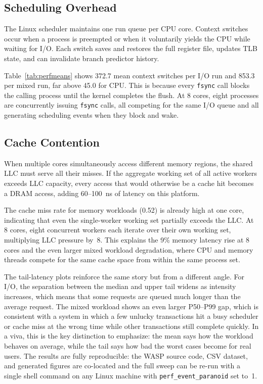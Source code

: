 \documentclass[conference]{IEEEtran}
\begin{document}
\subsection{Scheduling Overhead}

The Linux scheduler maintains one run queue per CPU core.  Context switches
occur when a process is preempted or when it voluntarily yields the CPU while
waiting for I/O.  Each switch saves and restores the full register file,
updates TLB state, and can invalidate branch predictor history.

Table~\ref{tab:perfmeans} shows 372.7 mean context switches per I/O run and
853.3 per mixed run, far above 45.0 for CPU.  This is because every
\texttt{fsync} call blocks the calling process until the kernel completes the
flush.  At 8 cores, eight processes are concurrently issuing \texttt{fsync}
calls, all competing for the same I/O queue and all generating scheduling
events when they block and wake.

\subsection{Cache Contention}

When multiple cores simultaneously access different memory regions, the
shared LLC must serve all their misses.  If the aggregate working set of all
active workers exceeds LLC capacity, every access that would otherwise be a
cache hit becomes a DRAM access, adding 60--100~ns of latency on this platform.

The cache miss rate for memory workloads (0.52) is already high at one core,
indicating that even the single-worker working set partially exceeds the LLC.
At 8 cores, eight concurrent workers each iterate over their own working set,
multiplying LLC pressure by~8.  This explains the 9\% memory latency rise at
8 cores and the even larger mixed workload degradation, where CPU and memory
threads compete for the same cache space from within the same process set.

The tail-latency plots reinforce the same story but from a different angle.
For I/O, the separation between the median and upper tail widens as intensity
increases, which means that some requests are queued much longer than the
average request.  The mixed workload shows an even larger P50--P99 gap,
which is consistent with a system in which a few unlucky transactions hit a
busy scheduler or cache miss at the wrong time while other transactions still
complete quickly.  In a viva, this is the key distinction to emphasize: the
mean says how the workload behaves on average, while the tail says how bad the
worst cases become for real users.
The results are fully reproducible: the WASP source code, CSV dataset, and
generated figures are co-located and the full sweep can be re-run with a
single shell command on any Linux machine with \texttt{perf\_event\_paranoid}
set to~1.
\end{document}
